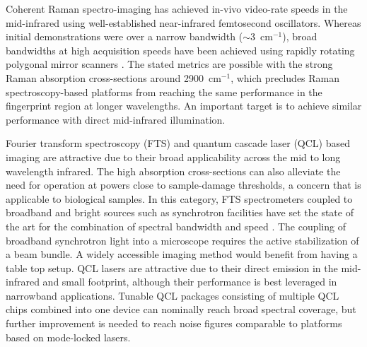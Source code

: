\documentclass{optica-article}
\begin{document}

Coherent Raman spectro-imaging has achieved in-vivo video-rate speeds in the mid-infrared \cite{evansChemicalImagingTissue2005, saarVideoRateMolecularImaging2010} using well-established near-infrared femtosecond oscillators. Whereas initial demonstrations were over a narrow bandwidth (\mbox{$\sim$3 $\mathrm{cm^{-1}}$}), broad bandwidths at high acquisition speeds have been achieved using rapidly rotating polygonal mirror scanners \cite{tamamitsuUltrafastBroadbandFouriertransform2017, linMicrosecondFingerprintStimulated2021}. The stated metrics are possible with the strong Raman absorption cross-sections around \mbox{2900 $\mathrm{cm^{-1}}$}, which precludes Raman spectroscopy-based platforms from reaching the same performance in the fingerprint region at longer wavelengths. An important target is to achieve similar performance with direct mid-infrared illumination.

Fourier transform spectroscopy (FTS) and quantum cascade laser (QCL) based imaging are attractive due to their broad applicability across the mid to long wavelength infrared. The high absorption cross-sections can also alleviate the need for operation at powers close to sample-damage thresholds, a concern that is applicable to biological samples. In this category, FTS spectrometers coupled to broadband and bright sources such as synchrotron facilities have set the state of the art for the combination of spectral bandwidth and speed \cite{nasseHighresolutionFouriertransformInfrared2011}. The coupling of broadband synchrotron light into a microscope requires the active stabilization of a beam bundle. A widely accessible imaging method would benefit from having a table top setup. QCL lasers are attractive due to their direct emission in the mid-infrared and small footprint, although their performance is best leveraged in narrowband applications. Tunable QCL packages consisting of multiple QCL chips combined into one device \cite{yehFastInfraredChemical2015,goyalActiveHyperspectralImaging2014,zimmerleiterQCLbasedMidinfraredHyperspectral2021} can nominally reach broad spectral coverage, but further improvement is needed to reach noise figures comparable to platforms based on mode-locked lasers.
\end{document}
